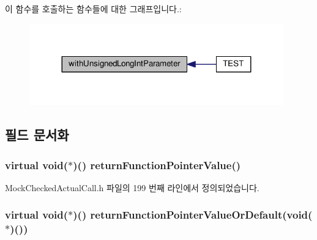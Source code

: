이 함수를 호출하는 함수들에 대한 그래프입니다.\+:
\nopagebreak
\begin{figure}[H]
\begin{center}
\leavevmode
\includegraphics[width=311pt]{class_mock_actual_call_trace_a6cbc626f3ed2fde276f312b1bef0a2d4_icgraph}
\end{center}
\end{figure}




\subsection{필드 문서화}
\subsubsection[{\texorpdfstring{return\+Function\+Pointer\+Value}{returnFunctionPointerValue}}]{\setlength{\rightskip}{0pt plus 5cm}virtual void($\ast$)() return\+Function\+Pointer\+Value()}\hypertarget{class_mock_actual_call_trace_abd8adc7ad48025440b2a4aee485f560d}{}\label{class_mock_actual_call_trace_abd8adc7ad48025440b2a4aee485f560d}


Mock\+Checked\+Actual\+Call.\+h 파일의 199 번째 라인에서 정의되었습니다.

\subsubsection[{\texorpdfstring{return\+Function\+Pointer\+Value\+Or\+Default}{returnFunctionPointerValueOrDefault}}]{\setlength{\rightskip}{0pt plus 5cm}virtual void($\ast$)() return\+Function\+Pointer\+Value\+Or\+Default(void($\ast$)())}\hypertarget{class_mock_actual_call_trace_af9c6303587f8f06ff55e48340ee3db5e}{}\label{class_mock_actual_call_trace_af9c6303587f8f06ff55e48340ee3db5e}


